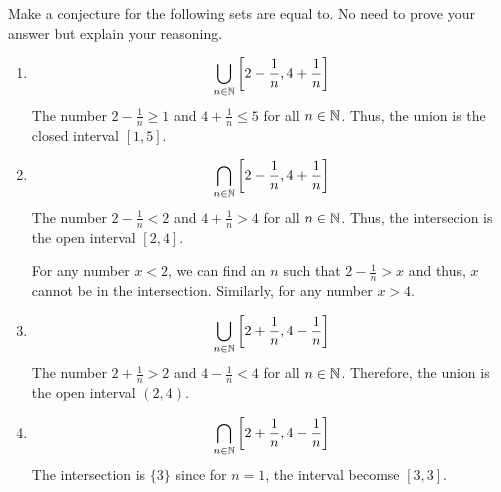 \bp
Make a conjecture for the following sets are equal to. No need to prove your answer but explain your reasoning.
\begin{enumerate}

	\item
	      $$\bigcup_{n \in \mathbb{N}} \left[ 2 - \frac{1}{n}, 4 + \frac{1}{n} \right]$$
	      \bs
	      The number $2 - \frac{1}{n} \geq 1$ and $4 + \frac{1}{n} \leq 5$ for all $n \in \mathbb{N}$. Thus, the union is the closed interval $[1, 5]$.
	      \es


	\item
	      $$\bigcap_{n \in \mathbb{N}} \left[ 2 - \frac{1}{n}, 4 + \frac{1}{n} \right]$$
	      \bs
	      The number $2 - \frac{1}{n} < 2$ and $4 + \frac{1}{n} > 4$ for all $n \in \mathbb{N}$. Thus, the intersecion is the open interval $[2, 4]$.

	      For any number $x < 2$, we can find an $n$ such that $2 - \frac{1}{n} > x$ and thus, $x$ cannot be in the intersection. Similarly, for any number $x > 4$.
	      \es

	\item $$\bigcup_{n \in \mathbb{N}} \left[ 2 + \frac{1}{n}, 4 - \frac{1}{n} \right]$$
	      \bs
	      The number $2 + \frac{1}{n} > 2$ and $4 - \frac{1}{n} < 4$ for all $n \in \mathbb{N}$. Therefore, the union is the open interval $(2, 4)$.
	      \es


	\item $$\bigcap_{n \in \mathbb{N}} \left[ 2 + \frac{1}{n}, 4 - \frac{1}{n} \right]$$
	      \bs The intersection is $\{3\}$ since for $n = 1$, the interval becomse $[3,3]$. \es

\end{enumerate}
\ep

